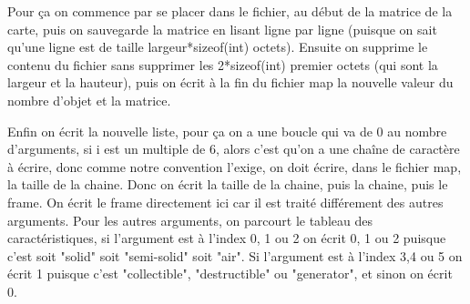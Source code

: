 \documentclass[10pt,a4paper]{article}
\begin{document}
            Pour ça on commence par se placer dans le fichier, au début de la matrice de la carte, puis on sauvegarde la matrice en lisant ligne par ligne (puisque on sait qu'une ligne est de taille largeur*sizeof(int) octets).
            Ensuite on supprime le contenu du fichier sans supprimer les 2*sizeof(int) premier octets (qui sont la largeur et la hauteur), puis on écrit à la fin du fichier map la nouvelle valeur du nombre d'objet et la matrice.
            
            Enfin on écrit la nouvelle liste, pour ça on a une boucle qui va de 0 au nombre d'arguments, si i est un multiple de 6, alors c'est qu'on a une chaîne de caractère à écrire, donc comme notre convention l'exige, on doit écrire, dans le fichier map, la taille de la chaine. Donc on écrit la taille de la chaine, puis la chaine, puis le frame. On écrit le frame directement ici car il est traité différement des autres arguments.
            Pour les autres arguments, on parcourt le tableau des caractéristiques, si l'argument est à l'index 0, 1 ou 2  on écrit 0, 1 ou 2 puisque c'est soit "solid" soit "semi-solid" soit "air". Si l'argument est à l'index 3,4 ou 5 on écrit 1 puisque c'est "collectible", "destructible" ou "generator", et sinon on écrit 0. 
            
\end{document}
